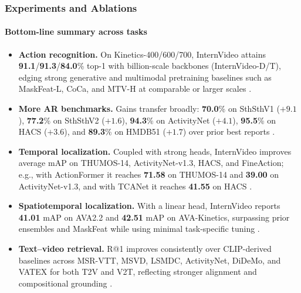 \begin{enrichment}
\begin{enrichment}
        \newpage
        
        \subsubsection{Experiments and Ablations}
        \label{subsubsec_chapter24_internvideo_experiments}
        
        \paragraph{Bottom-line summary across tasks}
        \begin{itemize}
            \item \textbf{Action recognition.} On Kinetics-400/600/700, InternVideo attains \textbf{91.1}/\textbf{91.3}/\textbf{84.0}\% top-1 with billion-scale backbones (InternVideo-D/T), edging strong generative and multimodal pretraining baselines such as MaskFeat-L, CoCa, and MTV-H at comparable or larger scales \cite{wang2022_internvideo,wei2022_maskfeat,yu2022_coca,yan2022_mtv}. 
            \item \textbf{More AR benchmarks.} Gains transfer broadly: \textbf{70.0}\% on SthSthV1 (\(+9.1\)), \textbf{77.2}\% on SthSthV2 (\(+1.6\)), \textbf{94.3}\% on ActivityNet (\(+4.1\)), \textbf{95.5}\% on HACS (\(+3.6\)), and \textbf{89.3}\% on HMDB51 (\(+1.7\)) over prior best reports \cite{wang2022_internvideo}. 
            \item \textbf{Temporal localization.} Coupled with strong heads, InternVideo improves average mAP on THUMOS-14, ActivityNet-v1.3, HACS, and FineAction; e.g., with ActionFormer it reaches \textbf{71.58} on THUMOS-14 and \textbf{39.00} on ActivityNet-v1.3, and with TCANet it reaches \textbf{41.55} on HACS \cite{wang2022_internvideo,zhang2022_actionformer,xu2021_tcanet}. 
            \item \textbf{Spatiotemporal localization.} With a linear head, InternVideo reports \textbf{41.01} mAP on AVA2.2 and \textbf{42.51} mAP on AVA-Kinetics, surpassing prior ensembles and MaskFeat while using minimal task-specific tuning \cite{wang2022_internvideo,pan2021_acar,li2020_relationalmaps,wei2022_maskfeat}. 
            \item \textbf{Text–video retrieval.} R@1 improves consistently over CLIP-derived baselines across MSR-VTT, MSVD, LSMDC, ActivityNet, DiDeMo, and VATEX for both T2V and V2T, reflecting stronger alignment and compositional grounding \cite{wang2022_internvideo,luo2022_clip4clip,ma2022_xclip,liu2022_ts2net}. 

\end{itemize}
\end{enrichment}
\end{enrichment}
